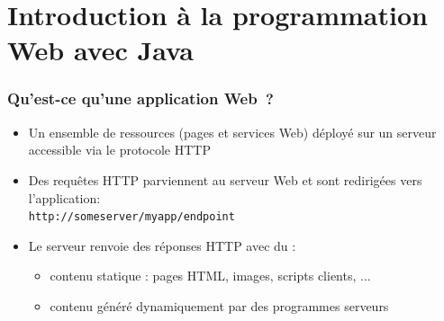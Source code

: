 \documentclass{beamer}
\begin{document}


\section{Introduction à la programmation Web avec Java}

\begin{frame}
  \frametitle{Qu'est-ce qu'une application Web~?}
  \begin{itemize}
  \item Un ensemble de ressources (pages et services Web) déployé sur un serveur accessible via le protocole HTTP
  \item Des requêtes HTTP parviennent au serveur Web et sont redirigées
    vers l'application:\\
    \texttt{http://{\color{green}someserver}/{\color{red}myapp}/endpoint}
  \item Le serveur renvoie des réponses HTTP avec du :
  \begin{itemize}
  \item contenu statique : pages HTML, images, scripts clients, ...
  \item contenu généré dynamiquement par des programmes serveurs
    \end{itemize}
  \end{itemize}
\end{frame}
\end{document}
